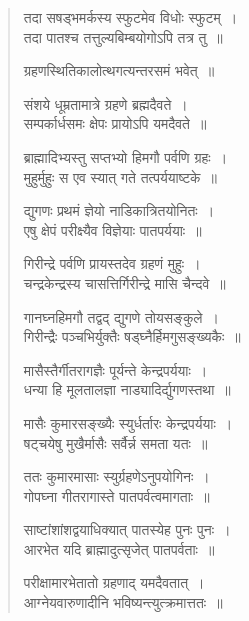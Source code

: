 \documentclass[11pt, openany]{book}
\begin{document}
\newpage
\begin{quote}
{\qt तदा सषड्भमर्कस्य स्फुटमेव विधोः स्फुटम्~।\\
तदा पातश्च तत्तुल्यबिम्बयोगोऽपि तत्र तु~॥

ग्रहणस्थितिकालोत्थगत्यन्तरसमं भवेत्~॥

संशये धूम्रतामात्रे ग्रहणे ब्रह्मदैवते~।\\
सम्पर्कार्धसमः क्षेपः प्रायोऽपि यमदैवते~॥

ब्राह्मादिभ्यस्तु सप्तभ्यो हिमगौ पर्वणि ग्रहः~।\\
मुहुर्मुहुः स एव स्यात् गते तत्पर्ययाष्टके~॥

द्युगणः प्रथमं ज्ञेयो नाडिकात्रितयोनितः~।\\
एषु क्षेपं परीक्ष्यैव विज्ञेयाः पातपर्ययाः~॥

गिरीन्द्रे पर्वणि प्रायस्तदेव ग्रहणं मुहुः~।\\
चन्द्रकेन्द्रस्य चासत्तिर्गिरीन्द्रे मासि चैन्दवे~॥

गानघ्नहिमगौ तद्वद् द्युगणे तोयसङ्कुले~।\\
गिरीन्द्रैः पञ्चभिर्युक्तैः षड्घ्नैर्हिमगुसङ्ख्यकैः~॥

मासैस्तैर्गीतरागज्ञैः पूर्यन्ते केन्द्रपर्ययाः~।\\
धन्या हि मूलतालज्ञा नाड्यादिर्द्युगणस्तथा~॥

मासैः कुमारसङ्ख्यैः स्युर्धर्तारः केन्द्रपर्ययाः~।\\
षट्चयेषु मुखैर्मासैः सर्वैर्न्न समता यतः~॥

ततः कुमारमासाः स्युर्ग्रहणेऽनुपयोगिनः~।\\
गोपघ्ना गीतरागास्ते पातपर्वत्वमागताः~॥

साष्टांशांशद्वयाधिक्यात् पातस्येह पुनः पुनः~।\\
आरभेत यदि ब्राह्मादुत्सृजेत् पातपर्वताः~॥

परीक्षामारभेतातो ग्रहणाद् यमदैवतात्~।\\
आग्नेयवारुणादीनि भविष्यन्त्युत्क्रमात्ततः~॥} 
\end{quote}

\newpage
\end{document}
